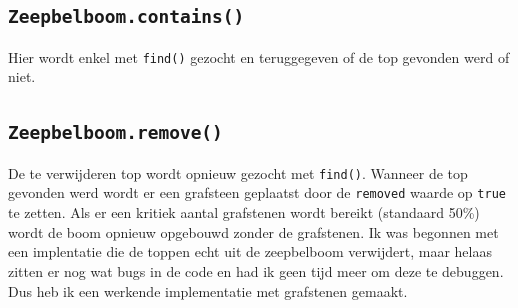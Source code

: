 \documentclass[12pt]{article}
\begin{document}
    \subsection{\tt Zeepbelboom.contains()}
    Hier wordt enkel met {\tt find()} gezocht en teruggegeven of de top gevonden werd
    of niet.
    \subsection{\tt Zeepbelboom.remove()}
    De te verwijderen top wordt opnieuw gezocht met {\tt find()}. Wanneer de top gevonden
    werd wordt er een grafsteen geplaatst door de {\tt removed} waarde op {\tt true} te
    zetten. Als er een kritiek aantal grafstenen wordt bereikt (standaard 50\%) wordt
    de boom opnieuw opgebouwd zonder de grafstenen.
    \newline \newline
    Ik was begonnen met een implentatie die de toppen echt uit de zeepbelboom verwijdert,
    maar helaas zitten er nog wat bugs in de code en had ik geen tijd meer om deze te
    debuggen. Dus heb ik een werkende implementatie met grafstenen gemaakt.

    
    
    
\end{document}

